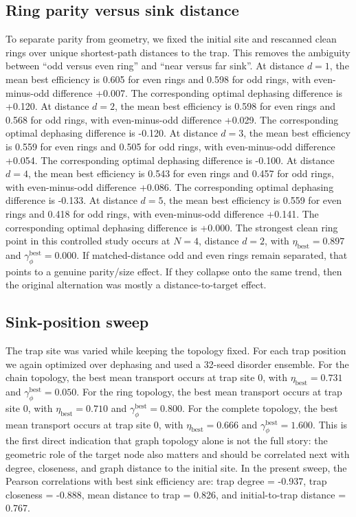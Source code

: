 \subsection{Ring parity versus sink distance}
To separate parity from geometry, we fixed the initial site and rescanned clean rings over unique shortest-path distances to the trap. This removes the ambiguity between ``odd versus even ring'' and ``near versus far sink''.
At distance $d=1$, the mean best efficiency is 0.605 for even rings and 0.598 for odd rings, with even-minus-odd difference +0.007. The corresponding optimal dephasing difference is +0.120.
At distance $d=2$, the mean best efficiency is 0.598 for even rings and 0.568 for odd rings, with even-minus-odd difference +0.029. The corresponding optimal dephasing difference is -0.120.
At distance $d=3$, the mean best efficiency is 0.559 for even rings and 0.505 for odd rings, with even-minus-odd difference +0.054. The corresponding optimal dephasing difference is -0.100.
At distance $d=4$, the mean best efficiency is 0.543 for even rings and 0.457 for odd rings, with even-minus-odd difference +0.086. The corresponding optimal dephasing difference is -0.133.
At distance $d=5$, the mean best efficiency is 0.559 for even rings and 0.418 for odd rings, with even-minus-odd difference +0.141. The corresponding optimal dephasing difference is +0.000.
The strongest clean ring point in this controlled study occurs at $N=4$, distance $d=2$, with $\eta_{\mathrm{best}}=0.897$ and $\gamma_\phi^{\mathrm{best}}=0.000$.
If matched-distance odd and even rings remain separated, that points to a genuine parity/size effect. If they collapse onto the same trend, then the original alternation was mostly a distance-to-target effect.

\subsection{Sink-position sweep}
The trap site was varied while keeping the topology fixed. For each trap position we again optimized over dephasing and used a 32-seed disorder ensemble.
For the chain topology, the best mean transport occurs at trap site 0, with $\eta_{\mathrm{best}}=0.731$ and $\gamma_\phi^{\mathrm{best}}=0.050$.
For the ring topology, the best mean transport occurs at trap site 0, with $\eta_{\mathrm{best}}=0.710$ and $\gamma_\phi^{\mathrm{best}}=0.800$.
For the complete topology, the best mean transport occurs at trap site 0, with $\eta_{\mathrm{best}}=0.666$ and $\gamma_\phi^{\mathrm{best}}=1.600$.
This is the first direct indication that graph topology alone is not the full story: the geometric role of the target node also matters and should be correlated next with degree, closeness, and graph distance to the initial site.
In the present sweep, the Pearson correlations with best sink efficiency are: trap degree = -0.937, trap closeness = -0.888, mean distance to trap = 0.826, and initial-to-trap distance = 0.767.

